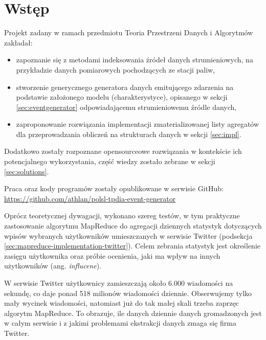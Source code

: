 \section{Wstęp}
\label{sec:intro}

Projekt zadany w ramach przedmiotu Teoria Przestrzeni Danych i Algorytmów zakładał:

\begin{itemize}[noitemsep]
  \item zapoznanie się z metodami indeksowania źródeł danych strumieniowych, na przykładzie danych pomiarowych pochodzących ze stacji paliw,
  \item stworzenie generycznego generatora danych emitującego zdarzenia na podstawie założonego modelu (charakterystyce), opisanego w sekcji \ref{sec:eventgenerator} odpowiadającemu strumieniowemu źródle danych\cite{stream-query-gorawski},
  \item zaproponowanie rozwiązania implementacji zmaterializowanej listy agregatów\cite{mal-lru-gorawski} dla przeprowadzania obliczeń na strukturach danych w sekcji \ref{sec:impl}.
\end{itemize}

Dodatkowo zostały rozpoznane opensourceowe rozwiązania w kontekście ich potencjalnego wykorzystania, część wiedzy zostało zebrane w sekcji \ref{sec:solutions}.

Praca oraz kody programów zostały opublikowane w serwisie GitHub:\\
\url{https://github.com/athlan/polsl-tpdia-event-generator}

Oprócz teoretycznej dywagacji, wykonano szereg testów, w tym praktyczne zastosowanie algorytmu MapReduce do agregacji dziennych statystyk dotyczących wpisów wybranych użytkowników umieszczanych w serwisie Twitter (podsekcja \ref{sec:mapreduce-implementation-twitter}). Celem zebrania statystyk jest określenie zasięgu użytkownika oraz próbie ocenienia, jaki ma wpływ na innych użytkowników (ang. \emph{influcene}).

W serwisie Twitter użytkownicy zamieszczają około 6.000 wiadomości na sekundę, co daje ponad 518 milionów wiadomości dziennie. Obserwujemy tylko mały wycinek wiadomości, natomiast już do tak małej skali trzeba zaprzęc algorytm MapReduce. To obrazuje, ile danych dziennie danych gromadzonych jest w całym serwisie i z jakimi problemami ekstrakcji danych zmaga się firma Twitter.
